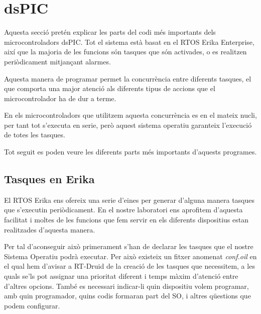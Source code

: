 \FloatBarrier

\section{dsPIC}\label{lab:imp:dspic:monitor}

Aquesta secció pretén explicar les parts del codi més importants dels microcontroladors dsPIC. Tot el sistema està basat en el RTOS Erika Enterprise, així que la majoria de les funcions són tasques que són activades, o es realitzen periòdicament mitjançant alarmes.

Aquesta manera de programar permet la concurrència entre diferents tasques, el que comporta una major atenció als diferents tipus de accions que el microcontrolador ha de dur a terme.

En els microcontroladors que utilitzem aquesta concurrència es en el mateix nucli, per tant tot s'executa en serie, però aquest sistema operatiu garanteix l'execució de totes les tasques.

Tot seguit es poden veure les diferents parts més importants d'aquests programes.

\subsection{Tasques en Erika}\label{lab:imp:dspic:monitor:tasks}

El RTOS Erika ens ofereix una serie d'eines per generar d'alguna manera tasques que s'executin periòdicament. En el nostre laboratori ens aprofitem d'aquesta facilitat i moltes de les funcions que fem servir en els diferents dispositius estan realitzades d'aquesta manera.

Per tal d'aconseguir això primerament s'han de declarar les tasques que el nostre Sistema Operatiu podrà executar. Per això existeix un fitxer anomenat \emph{conf.oil} en el qual hem d'avisar a RT-Druid de la creació de les tasques que necessitem, a les quals se'ls pot assignar una prioritat diferent i temps màxim d'atenció entre d'altres opcions. També es necessari indicar-li quin dispositiu volem programar, amb quin programador, quins codis formaran part del SO, i altres qüestions que podem configurar. 

